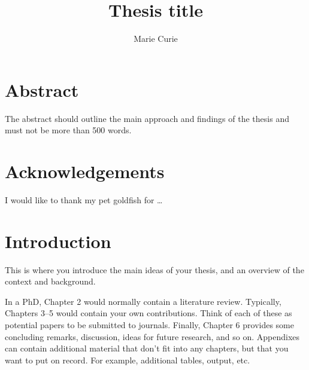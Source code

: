 \documentclass[doubleside,doublespace]{aucklandthesis}
\author{Marie Curie}
\title{Thesis title}
\begin{document}

\titlepage



\hypertarget{abstract}{%
\chapter*{Abstract}\label{abstract}}

The abstract should outline the main approach and findings of the thesis and must not be more than 500 words.

\cleardoublepage

\hypertarget{acknowledgements}{%
\chapter*{Acknowledgements}\label{acknowledgements}}

I would like to thank my pet goldfish for \dots

\cleardoublepage

\begingroup
{}\tighttoc\doublespacing
\endgroup

\clearpage

{}

\begingroup
{}\listoffigures\doublespacing
\endgroup

\clearpage

{}

\begingroup
{}\listoftables\doublespacing
\endgroup

\cleardoublepage

\setcounter{page}{0}

\hypertarget{ch:intro}{%
\chapter{Introduction}\label{ch:intro}}

This is where you introduce the main ideas of your thesis, and an overview of the context and background.

In a PhD, Chapter 2 would normally contain a literature review. Typically, Chapters 3--5 would contain your own contributions. Think of each of these as potential papers to be submitted to journals. Finally, Chapter 6 provides some concluding remarks, discussion, ideas for future research, and so on. Appendixes can contain additional material that don't fit into any chapters, but that you want to put on record. For example, additional tables, output, etc.
\end{document}
